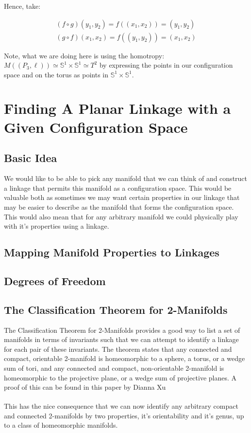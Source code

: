\documentclass{article}
\begin{document}
\noindent Hence, take:

\begin{gather*}
(f \circ g)(y_1, y_2) = f((x_1,x_2)) = (y_1, y_2) \\
(g \circ f)(x_1, x_2) = f((y_1,y_2)) = (x_1, x_2)
\end{gather*}

\noindent Note, what we are doing here is using the homotropy: $M((P_3,\ell)) \simeq \mathbb S^1 \times \mathbb S^1 \simeq T^2$ by expressing the points in our configuration space and on the torus as points in $\mathbb S^1 \times \mathbb S^1$.

\section{Finding A Planar Linkage with a Given Configuration Space}
\subsection{Basic Idea}

We would like to be able to pick any manifold that we can think of and construct a linkage that permits this manifold as a configuration space. This would be valuable both as sometimes we may want certain properties in our linkage that may be easier to describe as the manifold that forms the configuration space. This would also mean that for any arbitrary manifold we could physically play with it's properties using a linkage.

\subsection{Mapping Manifold Properties to Linkages}

\subsection{Degrees of Freedom}

\subsection{The Classification Theorem for 2-Manifolds}

The Classification Theorem for 2-Manifolds provides a good way to list a set of manifolds in terms of invariants such that we can attempt to identify a linkage for each pair of these invariants. The theorem states that any connected and compact, orientable 2-manifold is homeomorphic to a sphere, a torus, or a wedge sum of tori, and any connected and compact, non-orientable 2-manifold is homeomorphic to the projective plane, or a wedge sum of projective planes. A proof of this can be found in this paper by Dianna Xu \cite{proofofclassification} \\\\ This has the nice consequence that we can now identify any arbitrary compact and connected 2-manifolds by two properties, it's orientability and it's genus, up to a class of homeomorphic manifolds.
\end{document}
